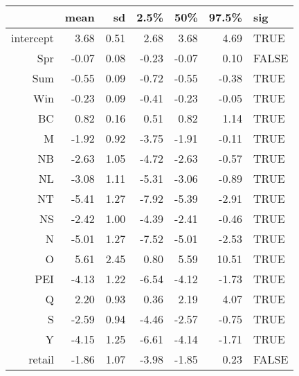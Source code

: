 \begin{table}[ht]
\centering
\begin{tabular}{rrrrrrl}
  \hline
 & mean & sd & 2.5\% & 50\% & 97.5\% & sig \\ 
  \hline
intercept & 3.68 & 0.51 & 2.68 & 3.68 & 4.69 & TRUE \\ 
  Spr & -0.07 & 0.08 & -0.23 & -0.07 & 0.10 & FALSE \\ 
  Sum & -0.55 & 0.09 & -0.72 & -0.55 & -0.38 & TRUE \\ 
  Win & -0.23 & 0.09 & -0.41 & -0.23 & -0.05 & TRUE \\ 
  BC & 0.82 & 0.16 & 0.51 & 0.82 & 1.14 & TRUE \\ 
  M & -1.92 & 0.92 & -3.75 & -1.91 & -0.11 & TRUE \\ 
  NB & -2.63 & 1.05 & -4.72 & -2.63 & -0.57 & TRUE \\ 
  NL & -3.08 & 1.11 & -5.31 & -3.06 & -0.89 & TRUE \\ 
  NT & -5.41 & 1.27 & -7.92 & -5.39 & -2.91 & TRUE \\ 
  NS & -2.42 & 1.00 & -4.39 & -2.41 & -0.46 & TRUE \\ 
  N & -5.01 & 1.27 & -7.52 & -5.01 & -2.53 & TRUE \\ 
  O & 5.61 & 2.45 & 0.80 & 5.59 & 10.51 & TRUE \\ 
  PEI & -4.13 & 1.22 & -6.54 & -4.12 & -1.73 & TRUE \\ 
  Q & 2.20 & 0.93 & 0.36 & 2.19 & 4.07 & TRUE \\ 
  S & -2.59 & 0.94 & -4.46 & -2.57 & -0.75 & TRUE \\ 
  Y & -4.15 & 1.25 & -6.61 & -4.14 & -1.71 & TRUE \\ 
  retail & -1.86 & 1.07 & -3.98 & -1.85 & 0.23 & FALSE \\ 
   \hline
\end{tabular}
\end{table}
